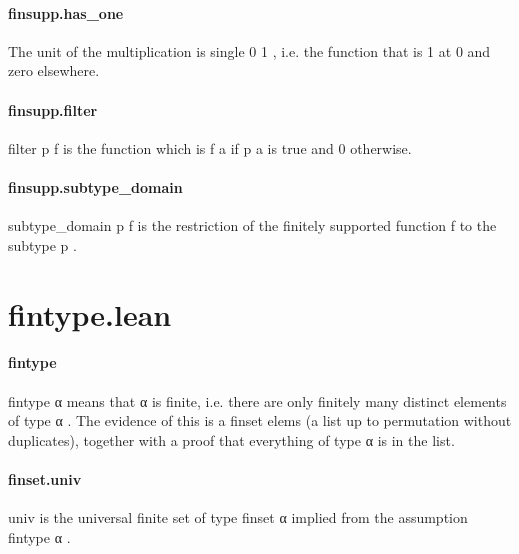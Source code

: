 \documentclass{article}
\begin{document}
\paragraph{finsupp.has\_one}
\par
The unit of the multiplication is 
\colorbox[RGB]{253,246,227}{{{{\color[RGB]{101, 123, 131} single  }}}{{{\color[RGB]{108, 113, 196} 0 }}}{{{\color[RGB]{101, 123, 131}   }}}{{{\color[RGB]{108, 113, 196} 1 }}}}, i.e. the function
that is 1 at 0 and zero elsewhere.
\paragraph{finsupp.filter}
\par
\colorbox[RGB]{253,246,227}{{{{\color[RGB]{101, 123, 131} filter p f }}}} is the function which is 
\colorbox[RGB]{253,246,227}{{{{\color[RGB]{101, 123, 131} f a }}}} if 
\colorbox[RGB]{253,246,227}{{{{\color[RGB]{101, 123, 131} p a }}}} is true and 0 otherwise.
\paragraph{finsupp.subtype\_domain}
\par
\colorbox[RGB]{253,246,227}{{{{\color[RGB]{101, 123, 131} subtype\_domain p f }}}} is the restriction of the finitely supported function
\colorbox[RGB]{253,246,227}{{{{\color[RGB]{101, 123, 131} f }}}} to the subtype 
\colorbox[RGB]{253,246,227}{{{{\color[RGB]{101, 123, 131} p }}}}.
\section{fintype.lean}\paragraph{fintype}
\par
\colorbox[RGB]{253,246,227}{{{{\color[RGB]{101, 123, 131} fintype α }}}} means that 
\colorbox[RGB]{253,246,227}{{{{\color[RGB]{101, 123, 131} α }}}} is finite, i.e. there are only
finitely many distinct elements of type 
\colorbox[RGB]{253,246,227}{{{{\color[RGB]{101, 123, 131} α }}}}. The evidence of this
is a finset 
\colorbox[RGB]{253,246,227}{{{{\color[RGB]{101, 123, 131} elems }}}} (a list up to permutation without duplicates),
together with a proof that everything of type 
\colorbox[RGB]{253,246,227}{{{{\color[RGB]{101, 123, 131} α }}}} is in the list.
\paragraph{finset.univ}
\par
\colorbox[RGB]{253,246,227}{{{{\color[RGB]{101, 123, 131} univ }}}} is the universal finite set of type 
\colorbox[RGB]{253,246,227}{{{{\color[RGB]{101, 123, 131} finset α }}}} implied from
the assumption 
\colorbox[RGB]{253,246,227}{{{{\color[RGB]{101, 123, 131} fintype α }}}}.
\end{document}
